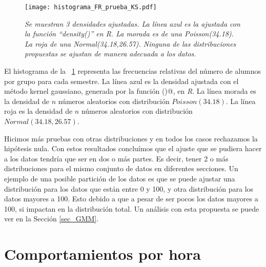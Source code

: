 
\begin{figure}[H]
\centering
\texttt{[image: histograma\_FR\_prueba\_KS.pdf]} %
\caption[\textit{Histograma con densidades ajustadas}]{\textit{Se muestran 3 densidades ajustadas. La línea azul es la ajustada con la función ``density()'' en R. La morada es de una Poisson(34.18). La roja de una Normal(34.18,26.57). Ninguna de las distribuciones propuestas se ajustan de manera adecuada a los datos.}}\label{histFR_pruebaKS}
\end{figure}

El histograma de la \figurename{~\ref{histFR_pruebaKS}} representa las frecuencias relativas del número de alumnos por grupo para cada semestre. La línea azul es la densidad ajustada con el método kernel gaussiano, generada por la función \verb@density()@, en \textit{R}. La línea morada es la densidad de $n$ números aleatorios con distribución $Poisson(34.18)$. La línea roja es la densidad de $n$ números aleatorios con distribución  $Normal(34.18,26.57)$.

Hicimos más pruebas con otras distribuciones y en todos los casos rechazamos la hipótesis nula. Con estos resultados concluímos que el ajuste que se pudiera hacer a los datos tendría que ser en dos o más partes. Es decir, tener 2 o más distribuciones para el mismo conjunto de datos en diferentes secciones. Un ejemplo de una posible partición de los datos es que se puede ajustar una distribución para los datos que están entre 0 y 100, y otra distribución para los datos mayores a 100. Esto debido a que a pesar de ser pocos los datos mayores a 100, si impactan en la distribución total. Un análisis con esta propuesta se puede ver en la Sección \ref{sec_GMM}.


\section{Comportamientos por hora}

